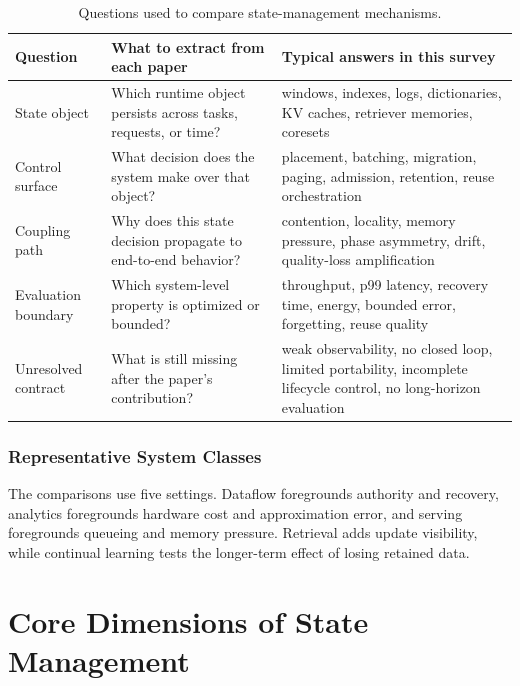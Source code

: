 \documentclass[manuscript]{acmart}
\begin{document}
\begin{table}[t]
\small
\caption{Questions used to compare state-management mechanisms.}
\label{tab:scaffold}
\begin{tabular}{@{}p{}p{}p{}@{}}
\toprule
Question & What to extract from each paper & Typical answers in this survey \\
\midrule
State object & Which runtime object persists across tasks, requests, or time? & windows, indexes, logs, dictionaries, KV caches, retriever memories, coresets \\

Control surface & What decision does the system make over that object? & placement, batching, migration, paging, admission, retention, reuse orchestration \\

Coupling path & Why does this state decision propagate to end-to-end behavior? & contention, locality, memory pressure, phase asymmetry, drift, quality-loss amplification \\

Evaluation boundary & Which system-level property is optimized or bounded? & throughput, p99 latency, recovery time, energy, bounded error, forgetting, reuse quality \\

Unresolved contract & What is still missing after the paper's contribution? & weak observability, no closed loop, limited portability, incomplete lifecycle control, no long-horizon evaluation \\
\bottomrule
\end{tabular}
\end{table}

\subsubsection{Representative System Classes}

The comparisons use five settings. Dataflow foregrounds authority and recovery, analytics foregrounds hardware cost and approximation error, and serving foregrounds queueing and memory pressure. Retrieval adds update visibility, while continual learning tests the longer-term effect of losing retained data.

\section{Core Dimensions of State Management}
\label{sec:core-dimensions}
\end{document}
